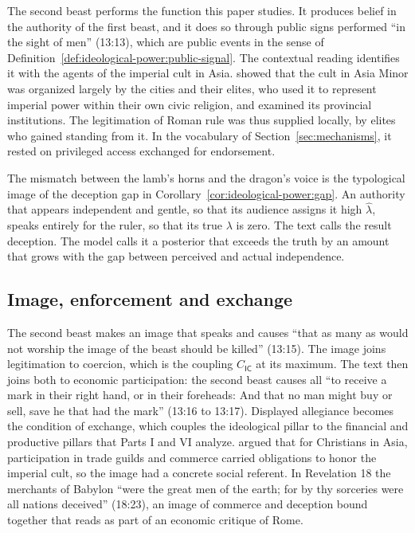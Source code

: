 \documentclass[11pt,letterpaper]{article}
\theoremstyle{definition}
\theoremstyle{remark}
\newcommand{\pI}{\mathsf{I}}
\newcommand{\pC}{\mathsf{C}}
\begin{document}
The second beast performs the function this paper studies. It produces belief in the authority of the first beast, and it does so through public signs performed ``in the sight of men'' (13:13), which are public events in the sense of Definition~\ref{def:ideological-power:public-signal}. The contextual reading identifies it with the agents of the imperial cult in Asia. \citet{price1984} showed that the cult in Asia Minor was organized largely by the cities and their elites, who used it to represent imperial power within their own civic religion, and \citet{friesen2001} examined its provincial institutions. The legitimation of Roman rule was thus supplied locally, by elites who gained standing from it. In the vocabulary of Section~\ref{sec:mechanisms}, it rested on privileged access exchanged for endorsement.

The mismatch between the lamb's horns and the dragon's voice is the typological image of the deception gap in Corollary~\ref{cor:ideological-power:gap}. An authority that appears independent and gentle, so that its audience assigns it high $\hat\lambda$, speaks entirely for the ruler, so that its true $\lambda$ is zero. The text calls the result deception. The model calls it a posterior that exceeds the truth by an amount that grows with the gap between perceived and actual independence.

\subsection{Image, enforcement and exchange}

The second beast makes an image that speaks and causes ``that as many as would not worship the image of the beast should be killed'' (13:15). The image joins legitimation to coercion, which is the coupling $C_{\pI\pC}$ at its maximum. The text then joins both to economic participation: the second beast causes all ``to receive a mark in their right hand, or in their foreheads: And that no man might buy or sell, save he that had the mark'' (13:16 to 13:17). Displayed allegiance becomes the condition of exchange, which couples the ideological pillar to the financial and productive pillars that Parts I and VI analyze. \citet{kraybill1996} argued that for Christians in Asia, participation in trade guilds and commerce carried obligations to honor the imperial cult, so the image had a concrete social referent. In Revelation 18 the merchants of Babylon ``were the great men of the earth; for by thy sorceries were all nations deceived'' (18:23), an image of commerce and deception bound together that \citet{bauckham1993} reads as part of an economic critique of Rome.
\end{document}
